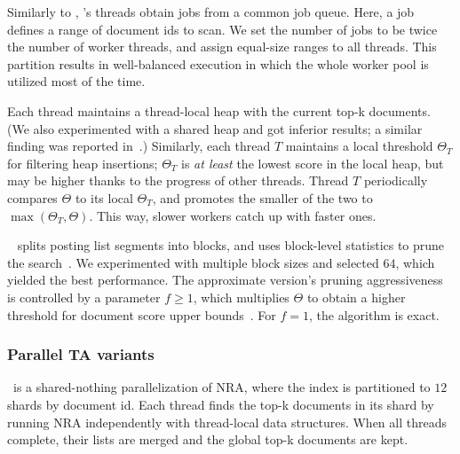 Similarly to \alg, \pBMW's threads obtain jobs from a common job queue. Here, a job defines a range of document ids to scan. 
We set the number of jobs to be twice the number of worker threads, and assign equal-size ranges to all threads.  
This partition results in well-balanced execution in which the whole worker pool is utilized 
most of the time. 

Each thread maintains a thread-local heap with the current top-k documents. (We also experimented with a shared heap and 
got inferior results; a similar finding was reported in~\cite{rojas2013distributing}.)
Similarly, each thread $T$ maintains a local threshold $\Theta_T$ for filtering heap insertions; 
$\Theta_T$ is \emph{at least} the lowest score in the local heap, but may be higher thanks to the progress of other threads.  
Thread $T$ periodically compares $\Theta$ to its local $\Theta_T$, and promotes the smaller of the two to $\max(\Theta_T, \Theta)$. 
This way,  slower workers catch up with  faster ones.

\pBMW\
splits posting list segments into blocks, and uses block-level
statistics to prune the search~\cite{Ding:2011}. We experimented with multiple block sizes and selected $64$, 
which yielded the best performance.
The approximate version's pruning aggressiveness is  controlled by  a parameter 
$f \geq 1$, which multiplies $\Theta$ to obtain a higher threshold for document score upper bounds~\cite{Broder:2003}. For $f=1$, the algorithm is exact.


\subsubsection{Parallel TA variants}

\sNRA\ is a shared-nothing parallelization of NRA, where the index is partitioned to $12$ shards by document id. 
Each thread finds the top-k documents in its shard by running NRA independently with thread-local data structures. 
When all threads complete, their lists are merged and the global top-k documents are kept.  

